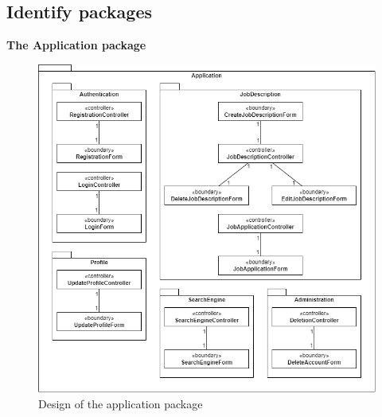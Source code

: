 \documentclass[a4paper]{article}
\begin{document}
    \subsection{Identify packages}
    \textbf{The Application package}
    \begin{figure}[H]
        \centering
        \includegraphics[width=1.0\textwidth]{application_package.drawio.png}
        \caption{Design of the application package}
        \label{fig:fig32}
    \end{figure}
\end{document}
